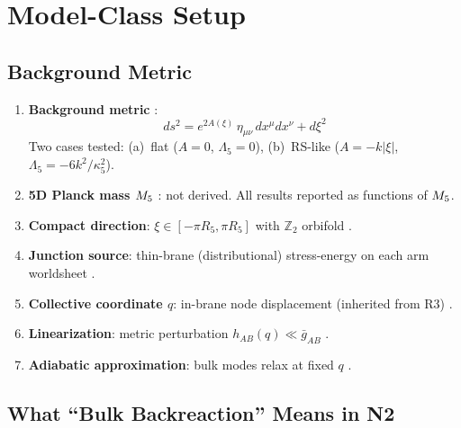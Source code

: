 \section{Model-Class Setup}
\label{sec:P2N2:model}

\subsection{Background Metric}

\begin{assumptionbox}[title=N2 Model Assumptions (Declared Before Computation)]
\begin{enumerate}
    \item \textbf{Background metric} \tagP:
    \begin{equation}
        ds^2 = e^{2A(\xi)}\,\eta_{\mu\nu}\,dx^\mu dx^\nu + d\xi^2
        \label{eq:N2_background}
    \end{equation}
    Two cases tested: (a)~flat ($A = 0$, $\Lambda_5 = 0$),
    (b)~RS-like ($A = -k|\xi|$, $\Lambda_5 = -6k^2/\kappa_5^2$).

    \item \textbf{5D Planck mass $M_5$} \tagP: not derived.
    All results reported as functions of $M_5$.

    \item \textbf{Compact direction}: $\xi \in [-\pi R_5, \pi R_5]$
    with $\mathbb{Z}_2$ orbifold \tagP.

    \item \textbf{Junction source}: thin-brane (distributional)
    stress-energy on each arm worldsheet \tagDef.

    \item \textbf{Collective coordinate $q$}: in-brane node
    displacement (inherited from R3) \tagDc.

    \item \textbf{Linearization}: metric perturbation
    $h_{AB}(q) \ll \bar{g}_{AB}$ \tagP.

    \item \textbf{Adiabatic approximation}: bulk modes relax at
    fixed $q$ \tagP.
\end{enumerate}
\end{assumptionbox}

\subsection{What ``Bulk Backreaction'' Means in N2}

